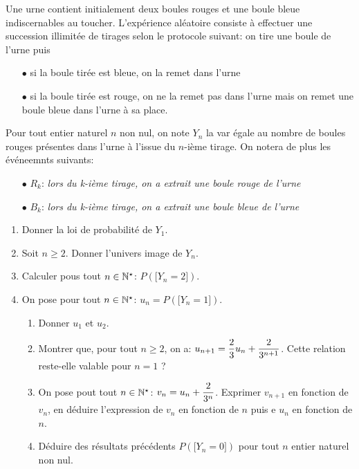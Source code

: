 \documentclass[a4paper, 11pt,reqno]{article}
\begin{document}
\begin{exercice}
	Une urne contient initialement deux boules rouges et une boule bleue indiscernables au toucher. L'exp\'erience al\'eatoire consiste \`a effectuer une succession illimit\'ee de tirages selon le protocole suivant: on tire une boule de l'urne puis
	\begin{itemize}
		\item[$\bullet$] si la boule tir\'ee est bleue, on la remet dans l'urne
		\item[$\bullet$]  si la boule tir\'ee est rouge, on ne la remet pas dans l'urne mais on remet une boule bleue dans l'urne \`a sa place.
	\end{itemize}
	Pour tout entier naturel $n$ non nul, on note $Y_n$ la var \'egale au nombre de boules rouges pr\'esentes dans l'urne \`a l'issue du $n$-i\`eme tirage. On notera de plus les \'ev\'eneemnts suivants:
	\begin{itemize}
		\item[$\bullet$] $R_k$: \textit{lors du k-i\`eme tirage, on a extrait une boule rouge de l'urne}
		\item[$\bullet$] $B_k$: \textit{lors du k-i\`eme tirage, on a extrait une boule bleue de l'urne}
	\end{itemize}
	\begin{enumerate}
		\item Donner la loi de probabilit\'e de $Y_1$.
		\item Soit $n\geq 2$. Donner l'univers image de $Y_n$.
		\item Calculer pous tout $n\in\mathbb{N}^{\star}$: $P(\lbrack Y_n=2\rbrack)$.
		\item On pose pour tout $n\in\mathbb{N}^{\star}$: $u_n=P(\lbrack Y_n=1\rbrack)$.
		      \begin{enumerate}
			      \item Donner $u_1$ et $u_2$.
			      \item Montrer que, pour tout $n\geq 2$, on a: $u_{n+1}=\displaystyle\frac{2}{3}u_n+\displaystyle\frac{2}{3^{n+1}}$. Cette relation reste-elle valable pour $n=1$ ?
			      \item On pose pout tout $n\in\mathbb{N}^{\star}$: $v_n=u_n+\displaystyle\frac{2}{3^n}$. Exprimer $v_{n+1}$ en fonction de $v_n$, en d\'eduire l'expression de $v_n$ en fonction de $n$ puis e $u_n$ en fonction de $n$.
			      \item D\'eduire des r\'esultats pr\'ec\'edents $P(\lbrack Y_n=0\rbrack)$ pour tout $n$ entier naturel non nul.
		      \end{enumerate}

\end{enumerate}
\end{exercice}
\end{document}
